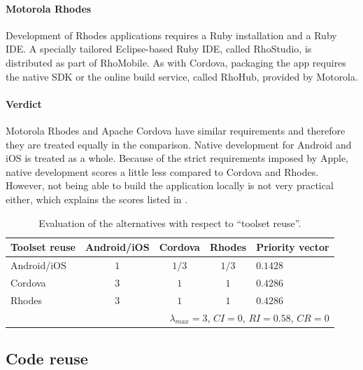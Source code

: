 \paragraph{Motorola Rhodes} Development of Rhodes applications requires a Ruby installation and a Ruby IDE. A specially tailored Eclipse-based Ruby IDE, called RhoStudio, is distributed as part of RhoMobile. As with Cordova, packaging the app requires the native SDK or the online build service, called RhoHub, provided by Motorola.

\paragraph{Verdict} Motorola Rhodes and Apache Cordova have similar requirements and therefore they are treated equally in the comparison. 
Native development for Android and iOS is treated as a whole. Because of the strict requirements imposed by Apple, native development scores a little less compared to Cordova and Rhodes. However, not being able to build the application locally is not very practical either, which explains the scores listed in .

\begin{table}[h!]
    \begin{center}
        \begin{tabular}{lcccl}
            \hline
            \textbf{Toolset reuse} & Android/iOS & Cordova & Rhodes & Priority vector \\
            \hline
            Android/iOS            & $1$         & $1/3$   & $1/3$  & $0.1428$        \\
            Cordova                & $3$         & $1$     & $1$    & $0.4286$        \\
            Rhodes                 & $3$         & $1$     & $1$    & $0.4286$        \\
            \hline
            \multicolumn{5}{r}{$\lambda_{max} = 3$, $CI = 0$, $RI = 0.58$, $CR = 0$}  \\
            \hline
        \end{tabular}
        \caption{Evaluation of the alternatives with respect to ``toolset reuse''.}
        \label{tab:tr}
    \end{center}
\end{table}

\subsection{Code reuse}
\label{sec:cr}

